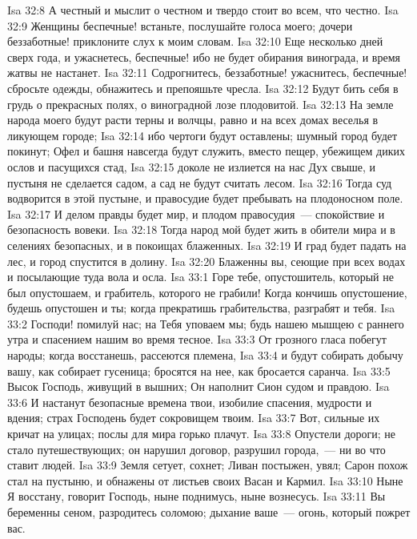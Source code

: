 \vs Isa 32:8 А честный и мыслит о честном и твердо стоит во всем, что честно.
\rsbpar\vs Isa 32:9 Женщины беспечные! встаньте, послушайте голоса моего; дочери беззаботные! приклоните слух к моим словам.
\vs Isa 32:10 Еще несколько дней сверх года, и ужаснетесь, беспечные! ибо не будет обирания винограда, и время жатвы не настанет.
\vs Isa 32:11 Содрогнитесь, беззаботные! ужаснитесь, беспечные! сбросьте одежды, обнажитесь и препояшьте чресла.
\vs Isa 32:12 Будут бить себя в грудь о прекрасных полях, о виноградной лозе плодовитой.
\vs Isa 32:13 На земле народа моего будут расти терны и волчцы, равно и на всех домах веселья в ликующем городе;
\vs Isa 32:14 ибо чертоги будут оставлены; шумный город будет покинут; Офел и башня навсегда будут служить, вместо пещер, убежищем диких ослов и пасущихся стад,
\vs Isa 32:15 доколе не излиется на нас Дух свыше, и пустыня не сделается садом, а сад не будут считать лесом.
\vs Isa 32:16 Тогда суд водворится в этой пустыне, и правосудие будет пребывать на плодоносном поле.
\vs Isa 32:17 И делом правды будет мир, и плодом правосудия~--- спокойствие и безопасность вовеки.
\vs Isa 32:18 Тогда народ мой будет жить в обители мира и в селениях безопасных, и в покоищах блаженных.
\vs Isa 32:19 И град будет падать на лес, и город спустится в долину.
\vs Isa 32:20 Блаженны вы, сеющие при всех водах и посылающие туда вола и осла.
\vs Isa 33:1 Горе тебе, опустошитель, который не был опустошаем, и грабитель, которого не грабили! Когда кончишь опустошение, будешь опустошен и ты; когда прекратишь грабительства, разграбят и тебя.
\vs Isa 33:2 Господи! помилуй нас; на Тебя уповаем мы; будь нашею мышцею с раннего утра и спасением нашим во время тесное.
\vs Isa 33:3 От грозного гласа  побегут народы; когда восстанешь, рассеются племена,
\vs Isa 33:4 и будут собирать добычу вашу, как собирает гусеница; бросятся на нее, как бросается саранча.
\vs Isa 33:5 Высок Господь, живущий в вышних; Он наполнит Сион судом и правдою.
\vs Isa 33:6 И настанут безопасные времена твои, изобилие спасения, мудрости и вдения; страх Господень будет сокровищем твоим.
\vs Isa 33:7 Вот, сильные их кричат на улицах; послы для мира горько плачут.
\vs Isa 33:8 Опустели дороги; не стало путешествующих; он нарушил договор, разрушил города,~--- ни во что ставит людей.
\vs Isa 33:9 Земля сетует, сохнет; Ливан постыжен, увял; Сарон похож стал на пустыню, и обнажены от листьев своих Васан и Кармил.
\rsbpar\vs Isa 33:10 Ныне Я восстану, говорит Господь, ныне поднимусь, ныне вознесусь.
\vs Isa 33:11 Вы беременны сеном, разродитесь соломою; дыхание ваше~--- огонь, который пожрет вас.
